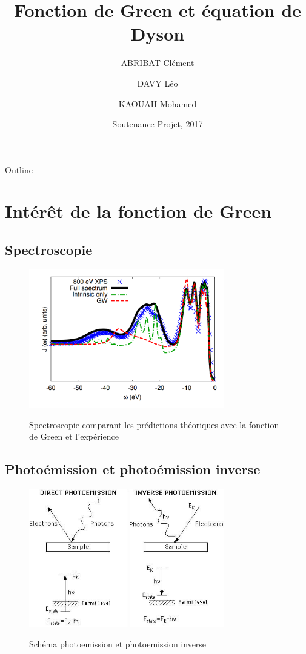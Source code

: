 \documentclass{beamer}
\title{Fonction de Green et \'equation de Dyson}
\author{ABRIBAT Cl\'ement \and DAVY L\'eo \and KAOUAH Mohamed}
\institute[Universities of Somewhere and Elsewhere] %
{
  
  L1 Parcours sp\'ecial}
\date{Soutenance Projet, 2017}
\begin{document}
\begin{frame}
  \titlepage 
\end{frame}

\begin{frame}{Outline}
  \tableofcontents
\end{frame}

\section{Int\'er\^et de la fonction de Green}

\subsection{Spectroscopie}
\begin{frame}
 \begin{figure}
\caption{Spectroscopie comparant les pr\'edictions th\'eoriques avec la fonction de Green et l'exp\'erience}
\includegraphics[width = 85mm]{spectre2.png}
\label{solb}
\end{figure}
\end{frame}
  


\subsection{Photo\'emission et photo\'emission inverse}
\begin{frame}
 \begin{figure}
\caption{Sch\'ema photoemission et photoemission inverse}
\includegraphics[width = 85mm]{photoem.jpg}
\label{solb}
\end{figure}
\end{frame}
\end{document}
